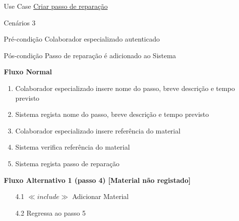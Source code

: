 \documentclass[../relatorio.tex]{subfiles}
\begin{document}
\begin{itemize}
    \item[Use Case] {\underline{Criar passo de reparação}}
    \item[Cenários] {3}
    \item[Pré-condição] {Colaborador especializado autenticado}
    \item[Pós-condição] {Passo de reparação é adicionado ao Sistema}
          \begin{flushleft}
              \textbf{Fluxo Normal}
          \end{flushleft}
          \begin{enumerate}
              \item Colaborador especializado insere nome do passo, breve descrição e tempo previsto
              \item Sistema regista nome do passo, breve descrição e tempo previsto
              \item Colaborador especializado insere referência do material
              \item Sistema verifica referência do material
              \item Sistema regista passo de reparação
          \end{enumerate}
          \begin{flushleft}
		      \textbf{Fluxo Alternativo 1 (passo 4) [Material não registado]}
	      \end{flushleft}
	      \begin{itemize}
		      \item[4.1]  $\ll include \gg$ Adicionar Material
              \item[4.2] Regressa ao passo 5
	      \end{itemize}
\end{itemize}
\end{document}
